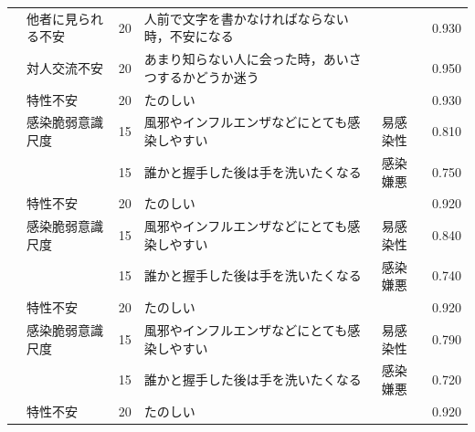 \begin{landscape}
\begin{longtable}{p{2cm}p{2cm}p{2cm}p{6cm}p{2cm}p{2cm}}
                                 & 他者に見られる不安                        & 20  & 人前で文字を書かなければならない時，不安になる                             &                      & 0.930   \\
                                 & 対人交流不安                           & 20  & あまり知らない人に会った時，あいさつするかどうか迷う                          &                      & 0.950   \\
                                 & 特性不安                             & 20  & たのしい                                                &                      & 0.930   \\
                                 & 感染脆弱意識尺度                         & 15  & 風邪やインフルエンザなどにとても感染しやすい                              & 易感染性                 & 0.810   \\
                                 &                                  & 15  & 誰かと握手した後は手を洗いたくなる                                   & 感染嫌悪                 & 0.750   \\
                                 & 特性不安                             & 20  & たのしい                                                &                      & 0.920   \\
                                 & 感染脆弱意識尺度                         & 15  & 風邪やインフルエンザなどにとても感染しやすい                              & 易感染性                 & 0.840   \\
                                 &                                  & 15  & 誰かと握手した後は手を洗いたくなる                                   & 感染嫌悪                 & 0.740   \\
                                 & 特性不安                             & 20  & たのしい                                                &                      & 0.920   \\
                                 & 感染脆弱意識尺度                         & 15  & 風邪やインフルエンザなどにとても感染しやすい                              & 易感染性                 & 0.790   \\
                                 &                                  & 15  & 誰かと握手した後は手を洗いたくなる                                   & 感染嫌悪                 & 0.720   \\
                                 & 特性不安                             & 20  & たのしい                                                &                      & 0.920   \\

\end{longtable}
\end{landscape}
